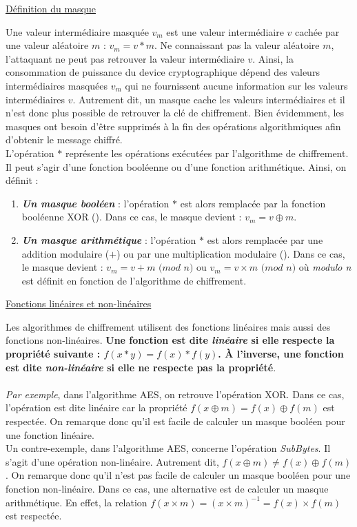 \documentclass[10pt, oneside, a4paper]{article}
\begin{document}
\underline{Définition du masque}

Une valeur intermédiaire masquée $v_m$ est une valeur intermédiaire $v$ cachée par une valeur aléatoire $m$ : $v_m = v * m$. Ne connaissant pas la valeur aléatoire $m$, l'attaquant ne peut pas retrouver la valeur intermédiaire $v$. Ainsi, la consommation de puissance du device cryptographique dépend des valeurs intermédiaires masquées $v_m$ qui ne fournissent aucune information sur les valeurs intermédiaires $v$. Autrement dit, un masque cache les valeurs intermédiaires et il n'est donc plus possible de retrouver la clé de chiffrement. Bien évidemment, les masques ont besoin d'être supprimés à la fin des opérations algorithmiques afin d'obtenir le message chiffré. \\
L'opération $*$ représente les opérations exécutées par l'algorithme de chiffrement. Il peut s'agir d'une fonction booléenne ou d'une fonction arithmétique. Ainsi, on définit : 
\begin{enumerate}
\item \textbf{\textit{Un masque booléen}} : l'opération $*$ est alors remplacée par la fonction booléenne XOR (\oplus). Dans ce cas, le masque devient : $v_m = v \oplus m$.
\item \textbf{\textit{Un masque arithmétique}} : l'opération $*$ est alors remplacée par une addition modulaire ($+$) ou par une multiplication modulaire (\times ). Dans ce cas, le masque devient : $v_m = v + m$ $(mod$ $n)$ ou $v_m = v \times m$ $(mod$ $n)$ où \textit{modulo n} est définit en fonction de l'algorithme de chiffrement.
\end{enumerate}

\newpage

\underline{Fonctions linéaires et non-linéaires}

Les algorithmes de chiffrement utilisent des fonctions linéaires mais aussi des fonctions non-linéaires. \textbf{Une fonction est dite \textit{linéaire} si elle respecte la propriété suivante : $f(x*y) = f(x)*f(y)$. À l'inverse, une fonction est dite \textit{non-linéaire} si elle ne respecte pas la propriété}.\\ \\
\textit{Par exemple}, dans l'algorithme AES, on retrouve l'opération XOR. Dans ce cas, l'opération est dite linéaire car la propriété $f(x\oplus m) = f(x) \oplus f(m)$ est respectée. On remarque donc qu'il est facile de calculer un masque booléen pour une fonction linéaire. \\
Un contre-exemple, dans l'algorithme AES, concerne l'opération \textit{SubBytes}. Il s'agit d'une opération non-linéaire. Autrement dit, $f(x\oplus m) \neq f(x) \oplus f(m)$. On remarque donc qu'il n'est pas facile de calculer un masque booléen pour une fonction non-linéaire. Dans ce cas, une alternative est de calculer un masque arithmétique. En effet, la relation $f(x \times m) = (x \times m)^{-1} = f(x) \times f(m)$ est respectée.
\end{document}
